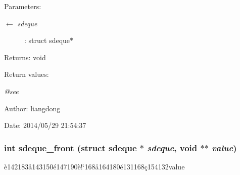 \begin{Desc}
\item[Parameters:]
\begin{description}
\item[\mbox{$\leftarrow$} {\em sdeque}]: struct sdeque$\ast$ \end{description}
\end{Desc}
\begin{Desc}
\item[Returns:]void \end{Desc}
\begin{Desc}
\item[Return values:]
\begin{description}
\item[{\em @see}]\end{description}
\end{Desc}
\begin{Desc}
\item[Author:]liangdong \end{Desc}
\begin{Desc}
\item[Date:]2014/05/29 21:54:37 \end{Desc}
\subsubsection{\setlength{\rightskip}{0pt plus 5cm}int sdeque\_\-front (struct sdeque $\ast$ {\em sdeque}, void $\ast$$\ast$ {\em value})}\label{sdeque_8c_a4}


\`{e}142183\aa{}143150\'{e}147190\`{e}!`168\aa{}164180\'{e}131168\c{c}154132value 

